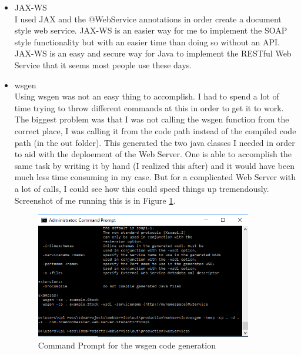 \documentclass [a4paper,12pt,oneside,final]{book}
\begin{document}
	\begin{itemize}
	\item JAX-WS \\
	I used JAX and the @WebService annotations in order create a document style web service. JAX-WS is an easier way for me to implement the SOAP style functionality but with an easier time than doing so without an API. JAX-WS is an easy and secure way for Java to implement the RESTful Web Service that it seems most people use these days.
	\item wsgen \\
	Using wsgen was not an easy thing to accomplish. I had to spend a lot of time trying to throw different commands at this in order to get it to work. The biggest problem was that I was not calling the wsgen function from the correct place, I was calling it from the code path instead of the compiled code path (in the out folder). This generated the two java classes I needed in order to aid with the deploement of the Web Server. One is able to accomplish the same task by writing it by hand (I realized this after) and it would have been much less time consuming in my case. But for a complicated Web Server with a lot of calls, I could see how this could speed things up tremendously. Screenshot of me running this is in Figure \ref{fig:cmd}.

	\begin{figure}[htp]
		\centering
		\vspace{20pt}
		\includegraphics[height=55mm]{cmd}
		\caption{Command Prompt for the wsgen code generation}
		\label{fig:cmd}
	\end{figure}
	
	\vspace{5mm}


\end{itemize}
\end{document}
